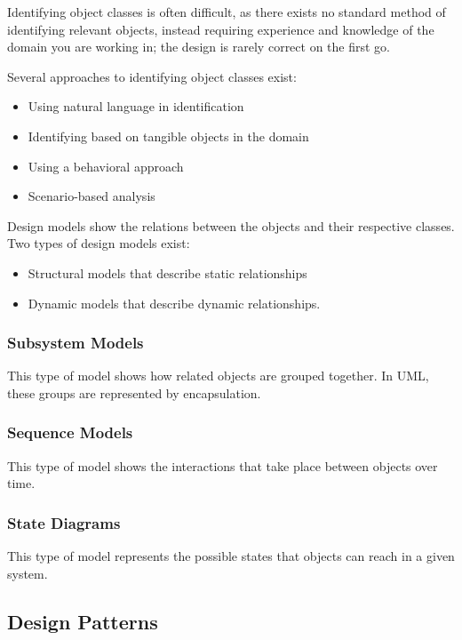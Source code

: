 \documentclass[12pt]{article}
\begin{document}
Identifying object classes is often difficult, as there exists no standard
method of identifying relevant objects, instead requiring experience and
knowledge of the domain you are working in; the design is rarely correct on the
first go.

Several approaches to identifying object classes exist:

\pagebreak
\begin{itemize}
    \item Using natural language in identification
    \item Identifying based on tangible objects in the domain
    \item Using a behavioral approach
    \item Scenario-based analysis
\end{itemize}

Design models show the relations between the objects and their respective
classes. Two types of design models exist:

\begin{itemize}
    \item Structural models that describe static relationships
    \item Dynamic models that describe dynamic relationships.
\end{itemize}

\subsubsection*{Subsystem Models}

This type of model shows how related objects are grouped together. In UML,
these groups are represented by encapsulation.

\subsubsection*{Sequence Models}

This type of model shows the interactions that take place between objects over
time.

\subsubsection*{State Diagrams}

This type of model represents the possible states that objects can reach in a
given system.

\subsection*{Design Patterns}
\end{document}
